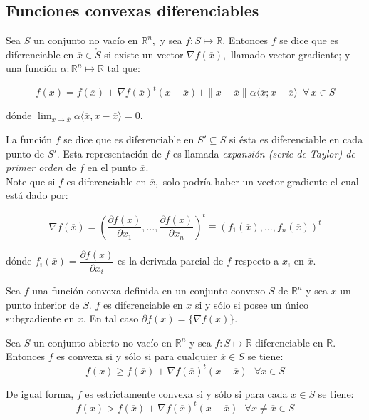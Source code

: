 \subsection{Funciones convexas diferenciables}

{ \cite{no-lineal} Sea $S$ un conjunto no vac\'io en $\mathbb{R}^n,$ y sea $f: S \longmapsto \mathbb{R}.$ Entonces $f$ se dice que es diferenciable
en $\overline{x} \in \mathring{S}$ si existe un vector $\nabla f(\overline{x}),$ llamado vector gradiente; y una funci\'on
$\alpha: \mathbb{R}^n \longmapsto \mathbb{R}$ tal que:

$$f(x) = f(\overline{x}) + \nabla f(\overline{x})^t (x - \overline{x}) + \parallel x - \overline{x} \parallel
\alpha \langle \overline{x}; x - \overline{x}\rangle \,\,\, \forall \, x \in S$$

d\'onde $\displaystyle{\lim_{x \rightarrow \overline{x}} \alpha \langle \overline{x}, x - \overline{x} \rangle = 0.}$ \label{def-dif}}
\medskip

La funci\'on $f$ se dice que es diferenciable en $S' \subseteq S$ si \'esta es diferenciable en cada punto de $S'.$ Esta representaci\'on de 
$f$ es llamada {\it expansi\'on (serie de Taylor) de primer orden} de $f$ en el punto $\overline{x}.$
\\
Note que si $f$ es diferenciable en $\overline{x},$ solo podr\'ia haber un vector gradiente el cual est\'a dado por:

$$\nabla f(\overline{x}) = \left( \dfrac{\partial f(\overline{x})}{\partial x_1}, \dots , 
\dfrac{\partial f(\overline{x})}{\partial x_n}\right)^t \equiv (f_1(\overline{x}), \ldots , f_n(\overline{x}))^t$$

d\'onde $f_i(\overline{x}) = \dfrac{\partial f(\overline{x})}{\partial x_i}$ es la derivada parcial de $f$ respecto a $x_i$ en $\overline{x}$.
\medskip

{\teorema Sea $f$ una funci\'on convexa definida en un conjunto convexo $S$ de $\mathbb{R}^n$ y sea $x$ un punto interior de $S.$ $f$ es 
diferenciable en $x$ si y s\'olo si posee un \'unico subgradiente en $x.$ En tal caso $\partial f(x) = \{\nabla f(x)\}.$ 
\label{one-subgradiente} }

\medskip

{\teorema Sea $S$ un conjunto abierto no vac\'io en $\mathbb{R}^n$ y sea $f: S \longmapsto \mathbb{R}$ diferenciable en $\mathbb{R}$. Entonces
$f$ es convexa si y s\'olo si para cualquier $\overline{x} \in S$ se tiene:
$$f(x) \geqslant f(\overline{x}) + \nabla f(\overline{x})^t(x - \overline{x})\,\,\,\, \forall x \in S$$

De igual forma, $f$ es estrictamente convexa si y s\'olo si para cada $x \in S$ se tiene:
$$f(x) > f(\overline{x}) + \nabla f(\overline{x})^t(x - \overline{x})\,\,\,\, \forall x \neq \overline{x} \in S$$ \label{carac1}}
\medskip

